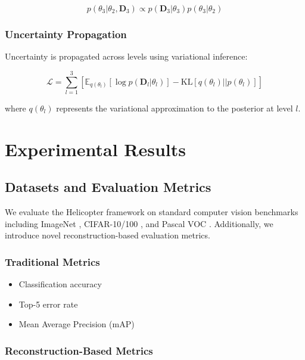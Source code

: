 \documentclass[12pt,a4paper]{article}
\begin{document}
\begin{equation}
p(\theta_3 | \theta_2, \mathbf{D}_3) \propto p(\mathbf{D}_3 | \theta_3) p(\theta_3 | \theta_2)
\end{equation}

\subsubsection{Uncertainty Propagation}

Uncertainty is propagated across levels using variational inference:

\begin{equation}
\mathcal{L} = \sum_{l=1}^{3} \left[ \mathbb{E}_{q(\theta_l)}[\log p(\mathbf{D}_l | \theta_l)] - \text{KL}[q(\theta_l) || p(\theta_l)] \right]
\end{equation}

where $q(\theta_l)$ represents the variational approximation to the posterior at level $l$.

\section{Experimental Results}

\subsection{Datasets and Evaluation Metrics}

We evaluate the Helicopter framework on standard computer vision benchmarks including ImageNet \cite{deng2009imagenet}, CIFAR-10/100 \cite{krizhevsky2009learning}, and Pascal VOC \cite{everingham2010pascal}. Additionally, we introduce novel reconstruction-based evaluation metrics.

\subsubsection{Traditional Metrics}

\begin{itemize}
\item Classification accuracy
\item Top-5 error rate
\item Mean Average Precision (mAP)
\end{itemize}

\subsubsection{Reconstruction-Based Metrics}
\end{document}
